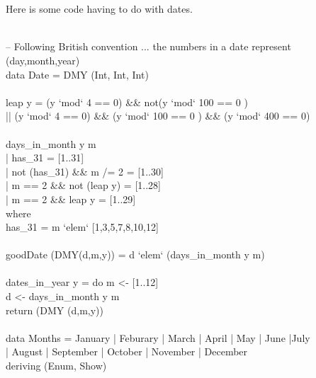 \documentclass[11pt]{article}
\begin{document}

\section{}


Here is some code having to do with dates.

\begin{program*}
\> \\
\> -- Following British convention ... the numbers in a date represent (day,month,year)  \\ 
\> data Date = DMY (Int, Int, Int) \\ 
\> \\
\> leap y = (y `mod` 4 == 0) \&\& not(y `mod` 100 == 0 ) \\
     ||  (y `mod` 4 == 0) \&\& (y `mod` 100 == 0 )   \&\& (y `mod` 400 == 0) \\ 
\> \\
\> days\_in\_month y m  \\ 
\>    | has\_31                     = [1..31] \\ 
\>    | not (has\_31) \&\& m /= 2     = [1..30] \\ 
\>    | m == 2 \&\& not (leap y)     = [1..28] \\ 
\>    | m == 2 \&\& leap y           = [1..29] \\ 
\>  where  \\ 
\>      has\_31 = m `elem` [1,3,5,7,8,10,12] \\ 
\> \\ 
\> goodDate (DMY(d,m,y)) = d `elem` (days\_in\_month y m) \\ 
\> \\
\> dates\_in\_year y = 
\>   do m <- [1..12] \\ 
\>      d <- days\_in\_month y m \\ 
\>      return (DMY (d,m,y)) \\ 
\> \\
\> data Months = January | Feburary | March | April | May | June |July \\
               | August | September | October | November | December  \\ 
\>   deriving (Enum, Show) 
\end{program*}
\end{document}
